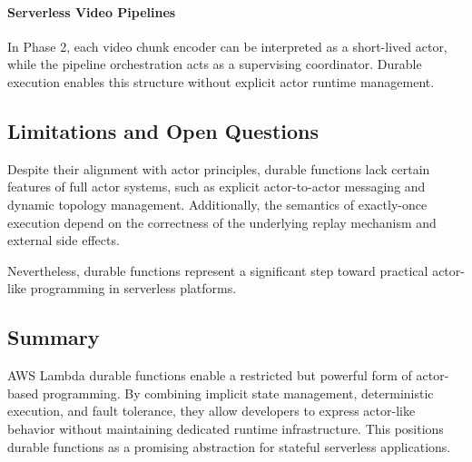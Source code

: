 \paragraph{Serverless Video Pipelines}
In Phase 2, each video chunk encoder can be interpreted as a short-lived actor, while the pipeline orchestration acts as a supervising coordinator. Durable execution enables this structure without explicit actor runtime management.

\subsection{Limitations and Open Questions}

Despite their alignment with actor principles, durable functions lack certain features of full actor systems, such as explicit actor-to-actor messaging and dynamic topology management. Additionally, the semantics of exactly-once execution depend on the correctness of the underlying replay mechanism and external side effects.

Nevertheless, durable functions represent a significant step toward practical actor-like programming in serverless platforms.

\subsection{Summary}

AWS Lambda durable functions enable a restricted but powerful form of actor-based programming. By combining implicit state management, deterministic execution, and fault tolerance, they allow developers to express actor-like behavior without maintaining dedicated runtime infrastructure. This positions durable functions as a promising abstraction for stateful serverless applications.

